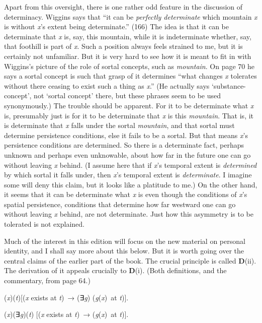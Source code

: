 \documentclass[
  11pt,
  letterpaper,
  DIV=11,
  numbers=noendperiod,
  twoside]{scrartcl}
\providecommand{\tightlist}{%
  \setlength{\itemsep}{0pt}\setlength{\parskip}{0pt}}\usepackage{longtable,booktabs,array}
\begin{document}
Apart from this oversight, there is one rather odd feature in the
discussion of determinacy. Wiggins says that ``it can be \emph{perfectly
determinate} which mountain \emph{x} is without \emph{x}'s extent being
determinate.'' (166) The idea is that it can be determinate that
\emph{x} is, say, this mountain, while it is indeterminate whether, say,
that foothill is part of \emph{x}. Such a position always feels strained
to me, but it is certainly not unfamiliar. But it is very hard to see
how it is meant to fit in with Wiggins's picture of the role of sortal
concepts, such as \emph{mountain}. On page 70 he says a sortal concept
is such that grasp of it determines ``what changes \emph{x} tolerates
without there ceasing to exist such a thing as \emph{x}.'' (He actually
says `substance-concept', not `sortal concept' there, but these phrases
seem to be used synonymously.) The trouble should be apparent. For it to
be determinate what \emph{x} is, presumably just is for it to be
determinate that \emph{x} is this \emph{mountain}. That is, it is
determinate that \emph{x} falls under the sortal \emph{mountain}, and
that sortal must determine persistence conditions, else it fails to be a
sortal. But that means \emph{x}'s persistence conditions are determined.
So there is a determinate fact, perhaps unknown and perhaps even
unknowable, about how far in the future one can go without leaving
\emph{x} behind. (I assume here that if \emph{x}'s temporal extent is
\emph{determined} by which sortal it falls under, then \emph{x}'s
temporal extent is \emph{determinate}. I imagine some will deny this
claim, but it looks like a platitude to me.) On the other hand, it seems
that it can be determinate what \emph{x} is even though the conditions
of \emph{x}'s spatial persistence, conditions that determine how far
westward one can go without leaving \emph{x} behind, are not
determinate. Just how this asymmetry is to be tolerated is not
explained.

Much of the interest in this edition will focus on the new material on
personal identity, and I shall say more about this below. But it is
worth going over the central claims of the earlier part of the book. The
crucial principle is called \textbf{D}(ii). The derivation of it appeals
crucially to \textbf{D}(i). (Both definitions, and the commentary, from
page 64.)

\begin{description}
\tightlist
\item[D(i)]
(\emph{x})(\emph{t}){[}(\emph{x} exists at \emph{t})~→ (∃\emph{g})
(\emph{g}(\emph{x})~at \emph{t}){]}.
\item[D(ii)]
(\emph{x})(∃\emph{g})(\emph{t}) {[}(\emph{x} exists at \emph{t})~→
(\emph{g}(\emph{x})~at \emph{t}){]}.
\end{description}
\end{document}
